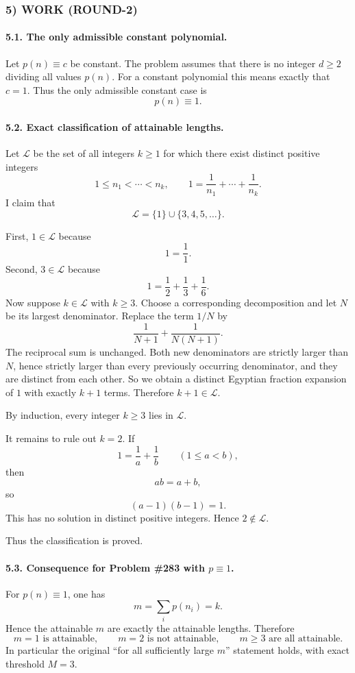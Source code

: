 \subsubsection*{5) WORK (ROUND-2)}

\paragraph{5.1. The only admissible constant polynomial.}
Let $p(n)\equiv c$ be constant. The problem assumes that there is no integer $d\ge 2$ dividing all values $p(n)$. For a constant polynomial this means exactly that $c=1$. Thus the only admissible constant case is
\[
 p(n)\equiv 1.
\]

\paragraph{5.2. Exact classification of attainable lengths.}
Let $\mathcal{L}$ be the set of all integers $k\ge 1$ for which there exist distinct positive integers
\[
1\le n_1<\cdots<n_k,
\qquad
1=\frac1{n_1}+\cdots+\frac1{n_k}.
\]
I claim that
\[
 \mathcal{L}=\{1\}\cup\{3,4,5,\dots\}.
\]

First, $1\in\mathcal{L}$ because
\[
1=\frac11.
\]
Second, $3\in\mathcal{L}$ because
\[
1=\frac12+\frac13+\frac16.
\]
Now suppose $k\in\mathcal{L}$ with $k\ge 3$. Choose a corresponding decomposition and let $N$ be its largest denominator. Replace the term $1/N$ by
\[
\frac1{N+1}+\frac1{N(N+1)}.
\]
The reciprocal sum is unchanged. Both new denominators are strictly larger than $N$, hence strictly larger than every previously occurring denominator, and they are distinct from each other. So we obtain a distinct Egyptian fraction expansion of $1$ with exactly $k+1$ terms. Therefore $k+1\in\mathcal{L}$.

By induction, every integer $k\ge 3$ lies in $\mathcal{L}$.

It remains to rule out $k=2$. If
\[
1=\frac1a+\frac1b
\qquad (1\le a<b),
\]
then
\[
ab=a+b,
\]
so
\[
(a-1)(b-1)=1.
\]
This has no solution in distinct positive integers. Hence $2\notin\mathcal{L}$.

Thus the classification is proved.

\paragraph{5.3. Consequence for Problem \#283 with $p\equiv 1$.}
For $p(n)\equiv 1$, one has
\[
 m=\sum_i p(n_i)=k.
\]
Hence the attainable $m$ are exactly the attainable lengths. Therefore
\[
 m=1 \text{ is attainable},\qquad m=2 \text{ is not attainable},\qquad m\ge 3 \text{ are all attainable}.
\]
In particular the original ``for all sufficiently large $m$'' statement holds, with exact threshold $M=3$.

